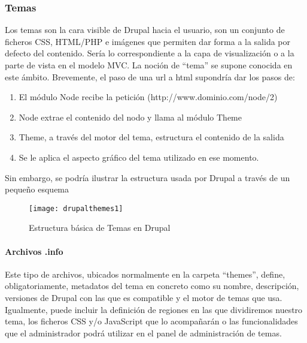 \subsubsection{Temas}
\par Los temas son la cara visible de Drupal hacia el usuario, son un conjunto de ficheros CSS, HTML/PHP e imágenes que permiten dar forma a la salida por defecto del contenido. Sería lo correspondiente a la capa de visualización o a la parte de vista en el modelo MVC. La noción de ``tema'' se supone conocida en este ámbito. Brevemente, el paso de una url a html supondría dar los pasos de:
\begin{enumerate}
\item El módulo Node recibe la petición (http://www.dominio.com/node/2)
\item Node extrae el contenido del nodo y llama al módulo Theme
\item Theme, a través del motor del tema, estructura el contenido de la salida
\item Se le aplica el aspecto gráfico del tema utilizado en ese momento.
\end{enumerate}

\par Sin embargo, se podría ilustrar la estructura usada por Drupal a través de un pequeño esquema \cite{fig:drupalthemes1}
\begin{figure}
\begin{narrow}{-0.12\linewidth}{-0.12\linewidth}
\centering
\texttt{[image: drupalthemes1]}
\caption{Estructura básica de Temas en Drupal\cite{references:drupalthemes}}
\end{narrow}
\label{fig:drupalthemes1}
\end{figure}

 
\paragraph{Archivos .info}
\par Este tipo de archivos, ubicados normalmente en la carpeta ``themes'', define, obligatoriamente, metadatos del tema en concreto como su nombre, descripción, versiones de Drupal con las que es compatible y el motor de temas que usa. Igualmente, puede incluir la definición de regiones en las que dividiremos nuestro tema, los ficheros CSS y/o JavaScript que lo acompañarán o las funcionalidades que el administrador podrá utilizar en el panel de administración de temas.

